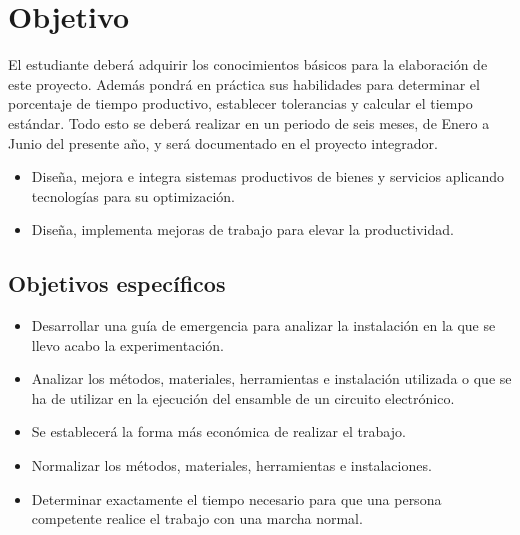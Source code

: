     \section{Objetivo}
    El estudiante deberá adquirir los conocimientos básicos para la elaboración de este proyecto. Además pondrá en práctica sus habilidades para determinar el porcentaje de tiempo productivo, establecer tolerancias y calcular el tiempo estándar. Todo esto se deberá realizar en un periodo de seis meses, de Enero a Junio del presente año, y será documentado en el proyecto integrador.
    \begin{itemize}
        \item Diseña, mejora e integra sistemas productivos de bienes y servicios aplicando tecnologías para su optimización.
        \item Diseña, implementa mejoras de trabajo para elevar la productividad.
    \end{itemize}
    
    \subsection{Objetivos específicos }
    \begin{itemize}
        \item Desarrollar una guía de emergencia para analizar la instalación en la que se llevo acabo la experimentación.
        \item Analizar los métodos, materiales, herramientas e instalación utilizada o que se ha de utilizar en la ejecución del ensamble de un circuito electrónico.
        \item Se establecerá la forma más económica de realizar el trabajo.
        \item Normalizar los métodos, materiales, herramientas e instalaciones.
        \item Determinar exactamente el tiempo necesario para que una persona competente realice el trabajo con una marcha normal.
    \end{itemize}
    
